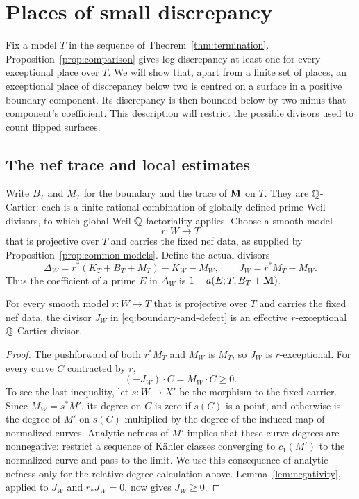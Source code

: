 \section{Places of small discrepancy}
\label{sec:low-places}

Fix a model $T$ in the sequence of Theorem~\ref{thm:termination}.
Proposition~\ref{prop:comparison} gives log discrepancy at least one
for every exceptional place over $T$.  We will show that, apart from a
finite set of places, an exceptional place of discrepancy below two is
centred on a surface in a positive boundary component.  Its discrepancy
is then bounded below by two minus that component's coefficient.
This description will restrict the possible divisors used to count
flipped surfaces.

\subsection{The nef trace and local estimates}

Write $B_T$ and $M_T$ for the boundary and the trace of $\mathbf M$ on $T$.
They are $\mathbb Q$-Cartier: each is a finite rational combination of globally
defined prime Weil divisors, to which global Weil $\mathbb Q$-factoriality applies.
Choose a smooth model
\[
 r\colon W\longrightarrow T
\]
that is projective over $T$ and carries the fixed nef data, as supplied by
Proposition~\ref{prop:common-models}.  Define the actual divisors
\begin{equation}
 \Delta_W=r^*(K_T+B_T+M_T)-K_W-M_W,
 \qquad J_W=r^*M_T-M_W.
 \label{eq:boundary-and-defect}
\end{equation}
Thus the coefficient of a prime $E$ in $\Delta_W$ is
$1-a(E;T,B_T+\mathbf M)$.

\begin{lemma}
\label{lem:nef-defect}
For every smooth model $r\colon W\to T$ that is projective over $T$ and
carries the fixed nef data, the divisor $J_W$ in
\eqref{eq:boundary-and-defect} is an effective
$r$-exceptional $\mathbb Q$-Cartier divisor.
\end{lemma}

\begin{proof}
The pushforward of both $r^*M_T$ and $M_W$ is $M_T$, so $J_W$ is
$r$-exceptional.  For every curve $C$ contracted by $r$,
\[
 (-J_W)\cdot C=M_W\cdot C\geq 0.
\]
To see the last inequality, let $s\colon W\to X'$ be the morphism to the
fixed carrier.  Since $M_W=s^*M'$, its degree on $C$ is zero if $s(C)$ is a
point, and otherwise is the degree of $M'$ on $s(C)$ multiplied by the
degree of the induced map of normalized curves.  Analytic nefness of $M'$
implies that these curve degrees are nonnegative: restrict a sequence of
K\"ahler classes converging to $c_1(M')$ to the normalized curve and pass to
the limit.  We use this consequence of analytic nefness only for the
relative degree calculation above.  Lemma~\ref{lem:negativity}, applied to
$J_W$ and $r_*J_W=0$, now gives $J_W\geq0$.
\end{proof}

